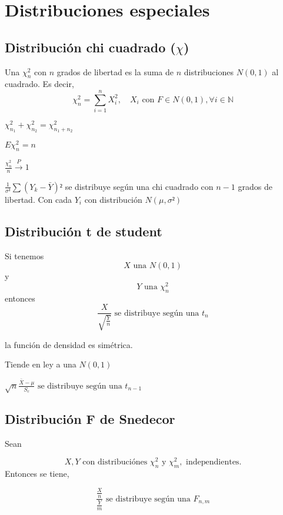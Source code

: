 \chapter{Distribuciones especiales}

\section{Distribución chi cuadrado ($\chi $)}

Una $\chi^2_n$ con $n$ grados de libertad es la suma
de $n$ distribuciones $N(0,1)$ al cuadrado. Es decir,
$$\chi_n^2=\sum_{i=1}^nX_i^2,\quad X_i\text{ con } F\in N(0,1),\forall i\in \mathbb{N}$$

\begin{itemize*}
\item $\chi_{n_1}^2+\chi_{n_2}^2=\chi_{n_1+n_2}^2$
\item $E\chi_n^2=n$
\item $\frac{\chi_n^2}{n} \xrightarrow{P} 1$
\item $\frac{1}{\sigma²}\sum(Y_k-\bar{Y})²$ se distribuye según una chi cuadrado
  con $n-1$ grados de libertad. Con cada $Y_i$ con distribución $N(\mu,\sigma²)$
\end{itemize*}

\section{Distribución t de student}
Si tenemos
$$X \text{ una } N(0,1)$$
y
$$Y \text{ una } \chi_n^2$$
entonces
$$\frac{X}{\sqrt{\frac{Y}{n}}} \text{ se distribuye según una } t_n$$

\begin{itemize*}
\item la función de densidad es simétrica.
\item Tiende en ley a una $N(0,1)$
\item $\sqrt{n}\frac{\bar{X}-\mu}{S_c} \text{ se distribuye según una } t_{n-1}$
\end{itemize*}

\section{Distribución F de Snedecor}

Sean

$$X,Y \text{ con distribuciónes } \chi_n^2 \text{ y } \chi_m^2,\text{ independientes.}$$
Entonces se tiene,

$$\frac{\frac{X}{n}}{\frac{Y}{m}} \text{ se distribuye según una } F_{n,m}$$
